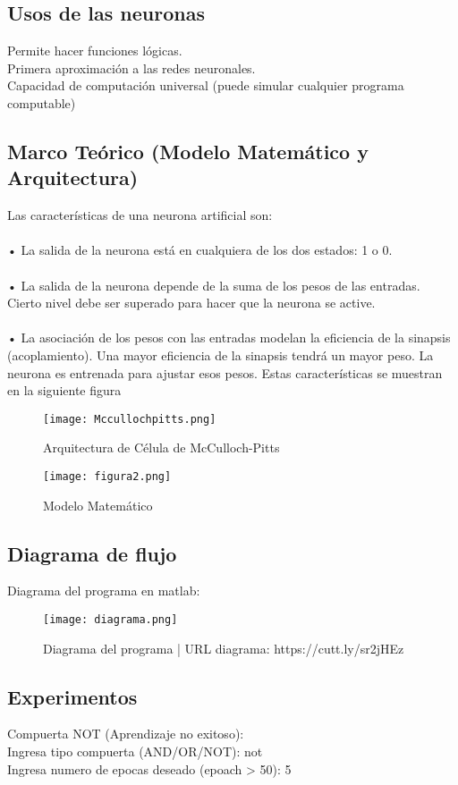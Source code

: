 \documentclass[]{article}
\begin{document}
	\subsection{Usos de las neuronas}
	
	Permite hacer funciones lógicas.\\	
	Primera aproximación a las redes neuronales.\\
	Capacidad de computación universal (puede simular cualquier programa computable)
	\subsection{Marco Teórico (Modelo Matemático y Arquitectura)}
	Las características de una neurona artificial son:\\\\
	• La salida de la neurona está en cualquiera de los dos estados: 1 o 0.\\\\
	• La salida de la neurona depende de la suma de los pesos de las entradas. Cierto nivel debe ser superado para hacer que la neurona se active.\\\\
	• La asociación de los pesos con las entradas modelan la eficiencia de la sinapsis (acoplamiento). Una mayor eficiencia de la sinapsis tendrá un mayor peso. La neurona es entrenada para ajustar esos pesos.
	Estas características se muestran en la siguiente figura	
	\begin{figure}[htb]
		\centering
		\texttt{[image: Mccullochpitts.png]}
		\caption{Arquitectura de Célula de McCulloch-Pitts}
	\end{figure}	
\begin{figure}[htb]
	\texttt{[image: figura2.png]}
	\caption{Modelo Matemático}
\end{figure}

\subsection{Diagrama de flujo}
Diagrama del programa en matlab: 
\begin{figure}
	\centering
	\texttt{[image: diagrama.png]}
	\caption{Diagrama del programa | URL diagrama: https://cutt.ly/sr2jHEz}
\end{figure}


\subsection{Experimentos}
Compuerta NOT (Aprendizaje no exitoso):\\
Ingresa tipo compuerta (AND/OR/NOT): not\\
Ingresa numero de epocas deseado (epoach > 50): 5
\end{document}
